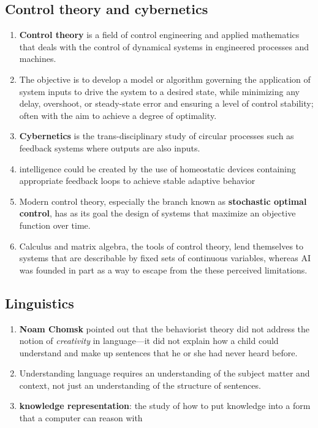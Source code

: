 \subsection{Control theory and cybernetics}
\begin{enumerate}
    \item \textbf{Control theory} is a field of control engineering and applied mathematics that deals with the control of dynamical systems in engineered processes and machines. \cite{wiki/Control_theory}
    
    \item The objective is to develop a model or algorithm governing the application of system inputs to drive the system to a desired state, while minimizing any delay, overshoot, or steady-state error and ensuring a level of control stability; often with the aim to achieve a degree of optimality. \cite{wiki/Control_theory}

    \item \textbf{Cybernetics} is the trans-disciplinary study of circular processes such as feedback systems where outputs are also inputs. \cite{wiki/Cybernetics}

    \item intelligence could be created by the use of homeostatic devices containing appropriate feedback loops to achieve stable adaptive behavior

    \item Modern control theory, especially the branch known as \textbf{stochastic optimal control}, has as its goal the design of systems that maximize an objective function over time.

    \item Calculus and matrix algebra, the tools of control theory, lend themselves to systems that are describable by fixed sets of continuous variables, whereas AI was founded in part as a way to escape from the these perceived limitations. 
\end{enumerate}

\subsection{Linguistics}
\begin{enumerate}
    \item \textbf{Noam Chomsk} pointed out that the behaviorist theory did not address the notion of \textit{creativity} in language—it did not explain how a child could understand and make up sentences that he or she had never heard before. 

    \item Understanding language requires an understanding of the subject matter and context, not just an understanding of the structure of sentences.

    \item \textbf{knowledge representation}: the study of how to put knowledge into a form that a computer can reason with
\end{enumerate}



